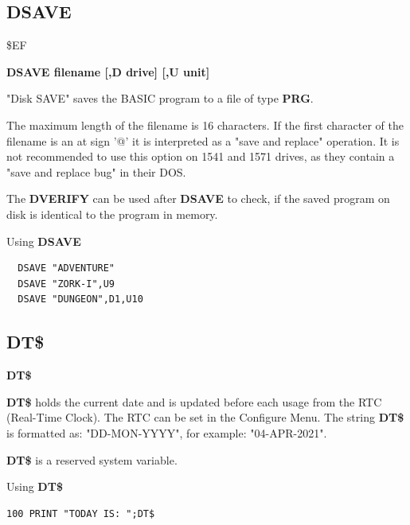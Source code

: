 \subsection{DSAVE}
\begin{description}[leftmargin=2cm,style=nextline]
\item [Token:] \$EF
\item [Format:] {\bf DSAVE filename [,D drive] [,U unit] }
\item [Usage:]
   "Disk SAVE" saves the BASIC program to
   a file of type {\bf PRG}.

   \filenamedefinition
   The maximum length of the filename is 16 characters.
   If the first character of the filename is an at sign '@' it
   is interpreted as a "save and replace" operation. It is not recommended
   to use this option on 1541 and 1571 drives, as they
   contain a "save and replace bug" in their DOS.

   \drivedefinition

   \unitdefinition

\item [Remarks:]
   The {\bf DVERIFY} can be used after {\bf DSAVE} to check,
   if the saved program on disk is identical to the program
   in memory.

\item [Example:] Using {\bf DSAVE}
\begin{tcolorbox}[colback=black,coltext=white]
\verbatimfont{\codefont}
\begin{verbatim}
  DSAVE "ADVENTURE"
  DSAVE "ZORK-I",U9
  DSAVE "DUNGEON",D1,U10
\end{verbatim}
\end{tcolorbox}
\end{description}


\newpage
\subsection{DT\$}
\begin{description}[leftmargin=2cm,style=nextline]
\item [Format:] {\bf DT\$}
\item [Usage:]  {\bf DT\$} holds the current date and is updated before
                each usage from the RTC (Real-Time Clock).
                The RTC can be set in the Configure Menu.
                The string {\bf DT\$} is formatted as:
                "DD-MON-YYYY", for example: "04-APR-2021".
\item[Remarks:] {\bf DT\$} is a reserved system variable.

\item [Example:] Using {\bf DT\$}
\begin{tcolorbox}[colback=black,coltext=white]
\verbatimfont{\codefont}
\begin{verbatim}
100 PRINT "TODAY IS: ";DT$
\end{verbatim}
\end{tcolorbox}
\end{description}

